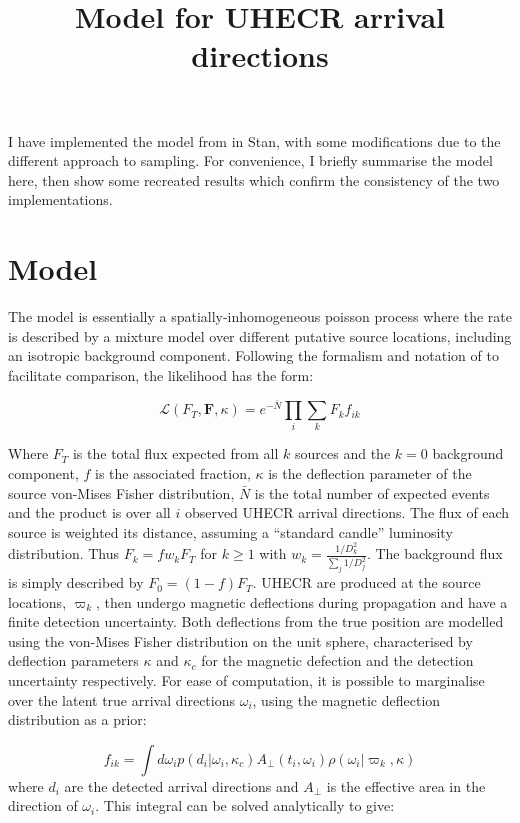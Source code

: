 \documentclass[fontsize=12pt]{article}
\title{\textbf{Model for UHECR arrival directions}}
\begin{document}
\maketitle
 
I have implemented the model from \cite{soiaporn} in Stan, with some modifications due to the different approach to sampling. For convenience, I briefly summarise the model here, then show some recreated results which confirm the consistency of the two implementations. 

\section{Model}

The model is essentially a spatially-inhomogeneous poisson process where the rate is described by a mixture model over different putative source locations, including an isotropic background component. Following the formalism and notation of \cite{soiaporn} to facilitate comparison, the likelihood has the form:

\begin{equation}
\mathcal{L}(F_T, \mathbf{F}, \kappa) = e^{-\bar{N}} \prod_i \sum_k F_k f_{ik}
\end{equation}

Where $F_T$ is the total flux expected from all $k$ sources and the $k = 0$ background component, $f$ is the associated fraction, $\kappa$ is the deflection parameter of the source von-Mises Fisher distribution, $\bar{N}$ is the total number of expected events and the product is over all $i$ observed UHECR arrival directions.  The flux of each source is weighted its distance, assuming a ``standard candle'' luminosity distribution. Thus $F_k = fw_kF_T$ for $k \geq 1$ with $w_k = \frac{1/D_k^2}{\sum_j 1/D_j^2}$. The background flux is simply described by $F_0 = (1 - f) F_T$. UHECR are produced at the source locations, $\varpi_k$, then undergo magnetic deflections during propagation and have a finite detection uncertainty. Both deflections from the true position are modelled using the von-Mises Fisher distribution on the unit sphere, characterised by deflection parameters $\kappa$ and $\kappa_c$ for the magnetic defection and the detection uncertainty respectively. For ease of computation, it is possible to marginalise over the latent true arrival directions $\omega_i$, using the magnetic deflection distribution as a prior:

\begin{equation}
f_{ik} = \int d \omega_i p(d_i | \omega_i, \kappa_c) A_{\perp} (t_i, \omega_i) \rho(\omega_i | \varpi_k, \kappa) 
\end{equation}
where $d_i$ are the detected arrival directions and $A_{\perp}$ is the effective area in the direction of $\omega_i$. This integral can be solved analytically to give:
\end{document}
